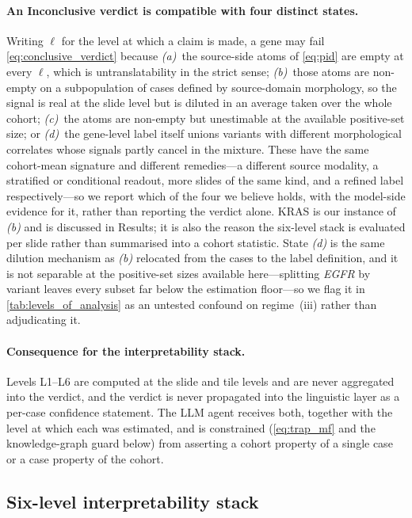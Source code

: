 \paragraph{An Inconclusive verdict is compatible with four distinct
states.}
Writing $\ell$ for the level at which a claim is made, a gene may
fail \cref{eq:conclusive_verdict} because
\emph{(a)}~the source-side atoms of \cref{eq:pid} are empty at every
$\ell$, which is untranslatability in the strict sense;
\emph{(b)}~those atoms are non-empty on a subpopulation of cases
defined by source-domain morphology, so the signal is real at the
slide level but is diluted in an average taken over the whole
cohort;
\emph{(c)}~the atoms are non-empty but unestimable at the available
positive-set size; or
\emph{(d)}~the gene-level label itself unions variants with different
morphological correlates whose signals partly cancel in the mixture.
These have the same cohort-mean signature and different remedies---a
different source modality, a stratified or conditional readout, more
slides of the same kind, and a refined label respectively---so we
report which of the four we believe holds, with the model-side
evidence for it, rather than reporting the verdict alone.
KRAS is our instance of \emph{(b)} and is discussed in Results; it is
also the reason the six-level stack is evaluated per slide rather
than summarised into a cohort statistic.
State \emph{(d)} is the same dilution mechanism as \emph{(b)} relocated
from the cases to the label definition, and it is not separable at the
positive-set sizes available here---splitting \textit{EGFR} by variant
leaves every subset far below the estimation floor---so we flag it in
\cref{tab:levels_of_analysis} as an untested confound on regime~(iii)
rather than adjudicating it.

\paragraph{Consequence for the interpretability stack.}
Levels L1--L6 are computed at the slide and tile levels and are never
aggregated into the verdict, and the verdict is never propagated into
the linguistic layer as a per-case confidence statement.
The LLM agent receives both, together with the level at which each
was estimated, and is constrained (\cref{eq:trap_mf} and the
knowledge-graph guard below) from asserting a cohort property of a
single case or a case property of the cohort.

\subsection*{Six-level interpretability stack}

